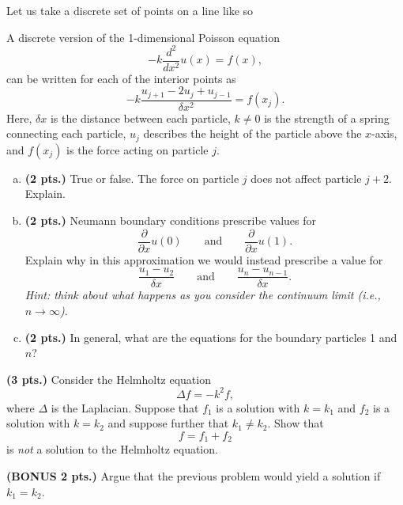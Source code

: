 \documentclass[12pt]{amsbook}
\begin{document}
\begin{problem}
Let us take a discrete set of points on a line like so
\begin{figure}[H]
    \centering
	\resizebox{.9\columnwidth}{!}{}
\end{figure}
A discrete version of the 1-dimensional Poisson equation
\[
-k\frac{d^2}{dx^2} u(x) = f(x),
\] 
can be written for each of the interior points as
\[
-k \frac{u_{j+1} - 2 u_j + u_{j-1}}{\delta x^2} = f(x_j).
\]
Here, $\delta x$ is the distance between each particle, $k\neq 0$ is the strength of a spring connecting each particle, $u_j$ describes the height of the particle above the $x$-axis, and $f(x_j)$ is the force acting on particle $j$. 

\begin{enumerate}[(a)]
    \item \textbf{(2 pts.)} True or false. The force on particle $j$ does not affect particle $j+2$. Explain.
    \item \textbf{(2 pts.)} Neumann boundary conditions prescribe values for
    \[
        \frac{\partial}{\partial x} u(0) \qquad \textrm{and} \qquad \frac{\partial}{\partial x} u(1).
    \]
    Explain why in this approximation we would instead prescribe a value for
    \[
    \frac{u_1-u_2}{\delta x}  \qquad \textrm{and} \qquad \frac{u_{n} - u_{n-1}}{\delta x}.
    \]
    \emph{Hint: think about what happens as you consider the continuum limit (i.e., $n\to \infty$)}.
    \item \textbf{(2 pts.)} In general, what are the equations for the boundary particles 1 and $n$?
\end{enumerate}
\end{problem}
\vspace*{.5cm}

\begin{problem}
\textbf{(3 pts.)} Consider the Helmholtz equation
\[
\Delta f = -k^2 f,
\]
where $\Delta$ is the Laplacian. Suppose that $f_1$ is a solution with $k=k_1$ and $f_2$ is a solution with $k=k_2$ and suppose further that $k_1 \neq k_2$. Show that 
\[
f = f_1+f_2
\]
is \emph{not} a solution to the Helmholtz equation. 
\end{problem}
\vspace*{.5cm}

\begin{problem}
\textbf{(BONUS 2 pts.)} Argue that the previous problem would yield a solution if $k_1=k_2$.
\end{problem}
\vspace*{.5cm}
\end{document}
